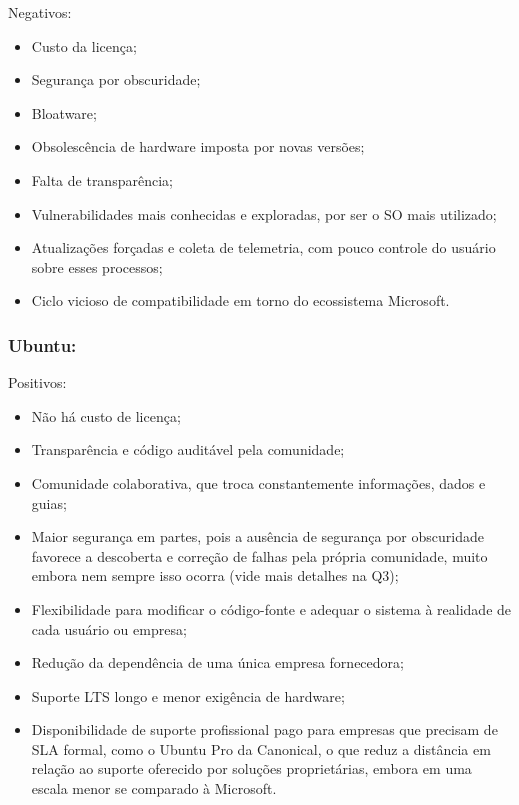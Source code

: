 Negativos:
\begin{itemize}
	\item Custo da licença;
	\item Segurança por obscuridade;
	\item Bloatware;
	\item Obsolescência de hardware imposta por novas versões;
	\item Falta de transparência;
	\item Vulnerabilidades mais conhecidas e exploradas, por ser o SO mais utilizado;
	\item Atualizações forçadas e coleta de telemetria, com pouco controle do usuário sobre esses processos;
	\item Ciclo vicioso de compatibilidade em torno do ecossistema Microsoft.
\end{itemize}

\subsubsection{Ubuntu:}
Positivos:
\begin{itemize}
	\item Não há custo de licença;
	\item Transparência e código auditável pela comunidade;
	\item Comunidade colaborativa, que troca constantemente informações, dados e guias;
	\item Maior segurança em partes, pois a ausência de segurança por obscuridade favorece a descoberta e correção de falhas pela própria comunidade, muito embora nem sempre isso ocorra (vide mais detalhes na Q3);
	\item Flexibilidade para modificar o código-fonte e adequar o sistema à realidade de cada usuário ou empresa;
	\item Redução da dependência de uma única empresa fornecedora;
	\item Suporte LTS longo e menor exigência de hardware;
	\item Disponibilidade de suporte profissional pago para empresas que precisam de SLA formal, como o Ubuntu Pro da Canonical, o que reduz a distância em relação ao suporte oferecido por soluções proprietárias, embora em uma escala menor se comparado à Microsoft.
\end{itemize}

